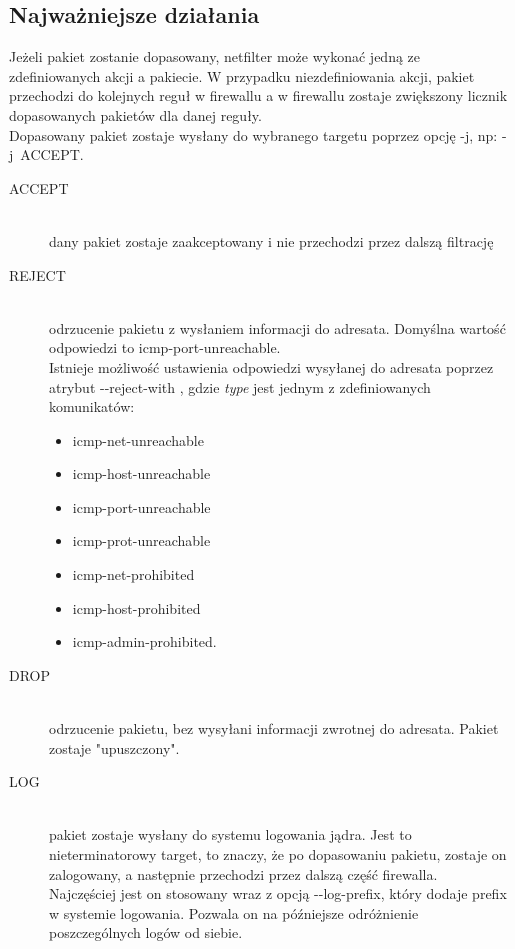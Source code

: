 		\subsection{Najważniejsze działania}
			Jeżeli pakiet zostanie dopasowany, netfilter może wykonać jedną ze zdefiniowanych akcji a pakiecie. W przypadku niezdefiniowania akcji, pakiet przechodzi do kolejnych reguł w firewallu a w firewallu zostaje zwiększony licznik dopasowanych pakietów dla danej reguły.\\
			Dopasowany pakiet zostaje wysłany do wybranego targetu poprzez opcję -j, np: -j~ACCEPT.
			\begin{description}
				\item[ACCEPT] \hfill \\
					dany pakiet zostaje zaakceptowany i nie przechodzi przez dalszą filtrację
				\item[REJECT] \hfill \\
					odrzucenie pakietu z wysłaniem informacji do adresata. Domyślna wartość odpowiedzi to icmp-port-unreachable.\\
					Istnieje możliwość ustawienia odpowiedzi wysyłanej do adresata poprzez atrybut -{}-reject-with ,
					gdzie \textit{type} jest jednym z zdefiniowanych komunikatów:
					\begin{itemize}
						\item icmp-net-unreachable
						\item icmp-host-unreachable
						\item icmp-port-unreachable
						\item icmp-prot-unreachable
						\item icmp-net-prohibited
						\item icmp-host-prohibited
						\item icmp-admin-prohibited.
					\end{itemize}
				\item[DROP] \hfill \\
					odrzucenie pakietu, bez wysyłani informacji zwrotnej do adresata. Pakiet zostaje "upuszczony".
				\item[LOG] \hfill \\
					pakiet zostaje wysłany do systemu logowania jądra. Jest to nieterminatorowy target, to znaczy, że po dopasowaniu pakietu, zostaje on zalogowany, a następnie przechodzi przez dalszą część firewalla.\\
					Najczęściej jest on stosowany wraz z opcją -{}-log-prefix, który dodaje prefix w systemie logowania. Pozwala on na późniejsze odróżnienie poszczególnych logów od siebie.

\end{description}
